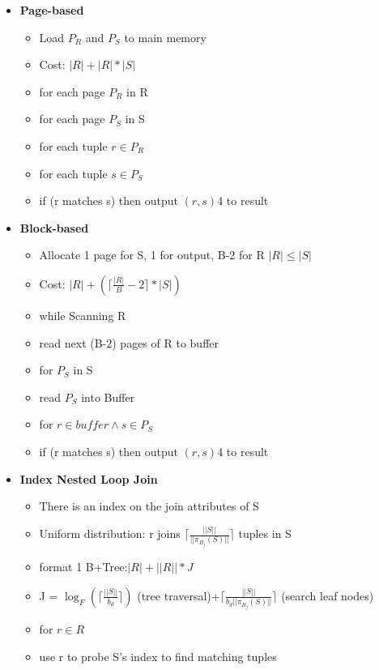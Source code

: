 \documentclass[10pt, landscape]{article}
\newcommand{\ceil}[1]{\lceil #1 \rceil}
\begin{document}
\begin{multicols}{4}
\begin{multicols}{2}
\begin{itemize}
      \item \textbf{Page-based} \newline
      \begin{itemize}
        \item Load $P_R$ and $P_S$ to main memory
        \item Cost: $|R| + |R|*|S|$
        \item for each page $P_R$ in R 
        \item for each page $P_S$ in S
        \item for each tuple $r \in P_R$
        \item for each tuple $s \in P_S$ 
        \item if (r matches s) then output $(r,s)$4 to result
      \end{itemize}


      \item \textbf{Block-based} \newline
      \begin{itemize}
        \item Allocate 1 page for S, 1 for output, B-2 for R $|R| \le |S|$
        \item Cost:  $|R| + (\ceil{\frac{|R|}B-2{}} * |S|)$
        \item while Scanning R
        \item read next (B-2) pages of R to buffer
        \item for $P_S$ in S
        \item read $P_S$ into Buffer
        \item for $r \in buffer \land s \in P_S$
        \item if (r matches s) then output $(r,s)$4 to result
      \end{itemize}

      \item \textbf{Index Nested Loop Join} \newline
      \begin{itemize}
        \item There is an index on the join attributes of S
        \item Uniform distribution: r joins $\ceil{\frac{||S||}{||\pi_{B_j}(S)||}}$ tuples in S
        \item format 1 B+Tree:$|R| + ||R|| * J$
        \item J = $\log_F(\ceil{\frac{||S||}{b_d}})$ (tree traversal)+$\ceil{\frac{||S||}{b_d||\pi_{B_j}(S)||}}$ (search leaf nodes)
        \item for $r \in R$ 
        \item use r to probe S's index to find matching tuples
      \end{itemize}
    \end{itemize}
\end{multicols}

\end{multicols}
\end{document}
